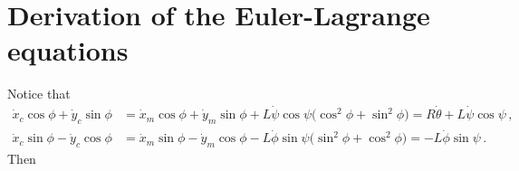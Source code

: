 \documentclass[a4paper]{article}
\newcommand{\pitch}{\psi}
\newcommand{\yaw}{\phi}
\newcommand{\roll}{\theta}
\begin{document}
\appendix

\section{Derivation of the Euler-Lagrange equations}
\label{sec:euler-lagrange-deriv}

Notice that
\begin{equation} \begin{split}
\label{eq:dot-xy}
    \dot{x}_c \cos\yaw + \dot{y}_c \sin\yaw
        &= \dot{x}_m \cos\yaw + \dot{y}_m \sin\yaw
         + L \dot\pitch \cos\pitch \big( \cos^2\yaw + \sin^2\yaw \big)
         = R \dot\roll + L \dot\pitch \cos\pitch
    \,, \\
    \dot{x}_c \sin\yaw - \dot{y}_c \cos\yaw
        &= \dot{x}_m \sin\yaw - \dot{y}_m \cos\yaw
         - L \dot\yaw \sin\pitch \big( \sin^2\yaw + \cos^2\yaw \big)
         = - L \dot\yaw \sin\pitch
    \,.
\end{split} \end{equation}
Then
\end{document}
